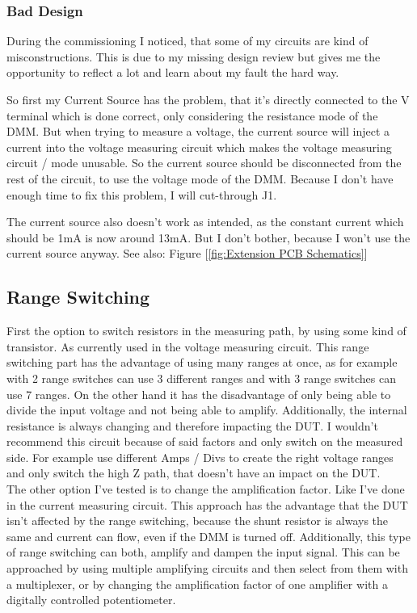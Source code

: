 \newpage

\subsubsection{Bad Design}
\label{sssec:baddesign}
During the commissioning I noticed, that some of my circuits are kind of misconstructions. This is due to my missing design review but gives me the opportunity to reflect a lot and learn about my fault the hard way.

So first my Current Source has the problem, that it's directly connected to the V terminal which is done correct, only considering the resistance mode of the DMM. But when trying to measure a voltage, the current source will inject a current into the voltage measuring circuit which makes the voltage measuring circuit / mode unusable. So the current source should be disconnected from the rest of the circuit, to use the voltage mode of the DMM. Because I don't have enough time to fix this problem, I will cut-through J1.

The current source also doesn't work as intended, as the constant current which should be 1mA is now around 13mA. But I don't bother, because I won't use the current source anyway.
See also: Figure [\ref{fig:Extension PCB Schematics}]

\subsection{Range Switching}
\label{subsec:rangeswitching}
First the option to switch resistors in the measuring path, by using some kind of transistor. As currently used in the voltage measuring circuit. This range switching part has the advantage of using many ranges at once, as for example with 2 range switches can use 3 different ranges and with 3 range switches can use 7 ranges. On the other hand it has the disadvantage of only being able to divide the input voltage and not being able to amplify. Additionally, the internal resistance is always changing and therefore impacting the DUT. I wouldn't recommend this circuit because of said factors and only switch on the measured side. For example use different Amps / Divs to create the right voltage ranges and only switch the high Z path, that doesn't have an impact on the DUT.
\\
The other option I've tested is to change the amplification factor. Like I've done in the current measuring circuit. This approach has the advantage that the DUT isn't affected by the range switching, because the shunt resistor is always the same and current can flow, even if the DMM is turned off. Additionally, this type of range switching can both, amplify and dampen the input signal. This can be approached by using multiple amplifying circuits and then select from them with a multiplexer, or by changing the amplification factor of one amplifier with a digitally controlled potentiometer.





